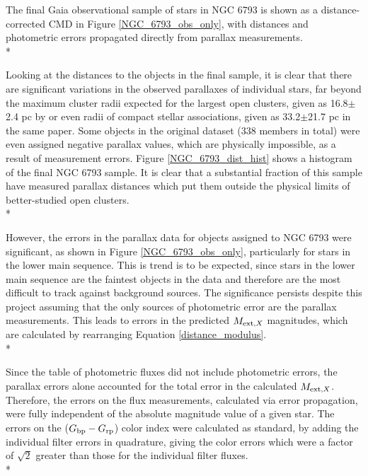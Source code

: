 \documentclass[12pt, a4paper]{report}
\begin{document}
The final Gaia observational sample of stars in NGC 6793 is shown as a distance-corrected CMD in Figure \ref{NGC_6793_obs_only}, with distances and photometric errors propagated directly from parallax measurements.\\*

Looking at the distances to the objects in the final sample, it is clear that there are significant variations in the observed parallaxes of individual stars, far beyond the maximum cluster radii expected for the largest open clusters, given as 16.8$\pm$2.4 pc by \cite{2006A&A...456..523S} or even radii of compact stellar associations, given as 33.2$\pm$21.7 pc in the same paper. Some objects in the original dataset (338 members in total) were even assigned negative parallax values, which are physically impossible, as a result of measurement errors. Figure \ref{NGC_6793_dist_hist} shows a histogram of the final NGC 6793 sample. It is clear that a substantial fraction of this sample have measured parallax distances which put them outside the physical limits of better-studied open clusters.\\*

However, the errors in the parallax data for objects assigned to NGC 6793 were significant, as shown in Figure \ref{NGC_6793_obs_only}, particularly for stars in the lower main sequence. This is trend is to be expected, since stars in the lower main sequence are the faintest objects in the data and therefore are the most difficult to track against background sources. The significance persists despite this project assuming that the only sources of photometric error are the parallax measurements. This leads to errors in the predicted $M_{\textnormal{ext},X}$ magnitudes, which are calculated by rearranging Equation \ref{distance_modulus}.\\*

Since the table of photometric fluxes did not include photometric errors, the parallax errors alone accounted for the total error in the calculated $M_{\textnormal{ext},X}$. Therefore, the errors on the flux measurements, calculated via error propagation, were fully independent of the absolute magnitude value of a given star. The errors on the ($G_{\textnormal{bp}}-G_{\textnormal{rp}}$) color index were calculated as standard, by adding the individual filter errors in quadrature, giving the color errors which were a factor of $\sqrt{2}$ greater than those for the individual filter fluxes.\\*
\end{document}
